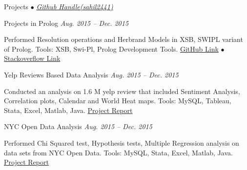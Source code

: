 \documentclass{resume} %
\begin{document}
\begin{rSection}{Projects {$\bullet$} \emph{\href{http://www.github.com/sahil2441}{\footnotesize Github Handle(sahil2441)}}}

\begin{rSubsection}{Projects in Prolog }{\emph{Aug. 2015 -- Dec. 2015}}{}{}
\item Performed Resolution operations and Herbrand Models in XSB, SWIPL variant of Prolog. Tools: XSB, Swi-Pl, Prolog Development Tools.
\href{https://github.com/sahil2441/Prolog-Problems}{GitHub Link}
{\tiny$\bullet$}
\href{http://stackoverflow.com/users/2733964/sahil-jain}{Stackoverflow Link}
\end{rSubsection}


\begin{rSubsection}{Yelp Reviews Based Data Analysis }{\emph{Aug. 2015 -- Dec. 2015}}{}{}
\item Conducted an analysis on 1.6 M yelp review that included Sentiment Analysis, Correlation plots, Calendar
      and World Heat maps.  Tools: MySQL, Tableau, Stata, Excel, Matlab, Java. 
\href{https://drive.google.com/file/d/0BzgUxxyAUxkycTZsY0pUUXY0NmM/view?usp=sharing}{Project Report}
\end{rSubsection}


\begin{rSubsection}{NYC Open Data Analysis  }{\emph{Aug. 2015 -- Dec. 2015} }{}{}
\item Performed Chi Squared test, Hypothesis tests, Multiple Regression analysis on data sets from NYC Open
      Data. Tools: MySQL, Stata, Excel, Matlab, Java.
     \href{https://drive.google.com/file/d/0BzgUxxyAUxkyZTRlVE9xZVR6NDg/view?usp=sharing}{Project Report}
\end{rSubsection}

\end{rSection}
\end{document}
